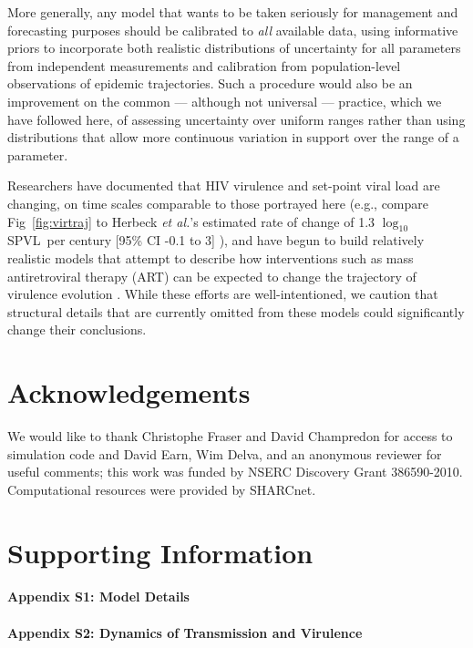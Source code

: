 \documentclass[10pt,letterpaper]{article}
\renewcommand{\figurename}{Fig}
\newcommand{\Lspvl}{$\log_{10}$ SPVL}
\newcommand{\etal}{\textit{et al.}}
\begin{document}
More generally, any model that wants to be
taken seriously for management and forecasting purposes should
be calibrated to \emph{all} available data, using informative
priors to incorporate both realistic distributions of uncertainty
for all parameters from independent measurements \cite{elderd_uncertainty_2006}
and calibration from population-level observations of epidemic
trajectories. Such a procedure would also be an improvement on the common --- although not universal --- %
practice, which we have followed here,
of assessing uncertainty over uniform ranges rather than
using distributions that allow more continuous variation in support over
the range of a parameter.

Researchers have documented that HIV virulence and set-point viral
load are changing, on time scales comparable to those portrayed here
(e.g., compare \figurename~\ref{fig:virtraj} to Herbeck \etal's
estimated rate of change of 1.3 \Lspvl\ per century [95\% CI -0.1 to
  3] \cite{herbeck_is_2012}), and have begun to build relatively realistic models that
attempt to describe how interventions such as mass antiretroviral
therapy (ART) can be expected to change the trajectory of virulence
evolution \cite{payne_impact_2014,roberts2015impact,herbeck_evolution_2016}.  While these
efforts are well-intentioned, we caution that 
structural details that are currently omitted from these models
could significantly change their conclusions.

\section*{Acknowledgements}
We would like to thank Christophe Fraser and
David Champredon for access to simulation code
and David Earn, Wim Delva, and an anonymous reviewer for useful comments;
this work was funded by NSERC Discovery Grant 386590-2010.
Computational resources were provided by SHARCnet.

\section*{Supporting Information}

\paragraph*{Appendix S1: Model Details}
\label{S1_Appendix}

\paragraph*{Appendix S2: Dynamics of Transmission and Virulence}
\label{S2_Appendix}

\clearpage

\nolinenumbers

%
%
% 


\end{document}
